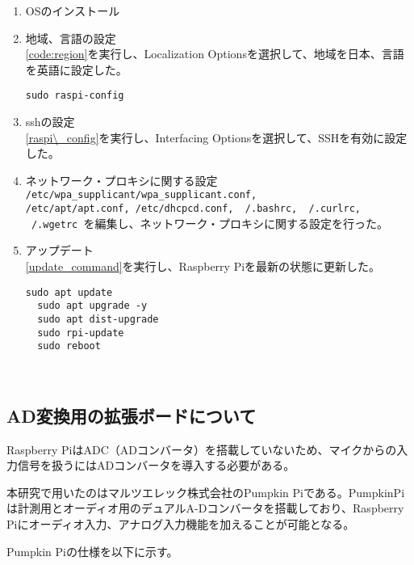 \begin{enumerate}
\renewcommand{\labelenumi}{(\arabic{enumi})}
\item
  OSのインストール
\item
  地域、言語の設定 \\
  \ref{code:region}を実行し、Localization Optionsを選択して、地域を日本、言語を英語に設定した。
  \begin{lstlisting}[caption=Raspberry Piのコンフィグレーションツールの起動コマンド, label=raspi_config]
  sudo raspi-config
  \end{lstlisting}
\item
  sshの設定 \\
  \ref{raspi\_config}を実行し、Interfacing Optionsを選択して、SSHを有効に設定した。
\item
  ネットワーク・プロキシに関する設定 \\
  \texttt{/etc/wpa_supplicant/wpa_supplicant.conf, \\
  /etc/apt/apt.conf, 
  /etc/dhcpcd.conf, 
  ~/.bashrc, 
  ~/.curlrc, 
  ~/.wgetrc
  }を編集し、ネットワーク・プロキシに関する設定を行った。

\item
  アップデート \\
  \ref{update_command}を実行し、Raspberry Piを最新の状態に更新した。

  \begin{lstlisting}[caption=Raspberry Piのアップデートコマンド,label=update_command]
  sudo apt update 
  sudo apt upgrade -y 
  sudo apt dist-upgrade
  sudo rpi-update
  sudo reboot
  \end{lstlisting}
\end{enumerate}

\
\subsection{AD変換用の拡張ボードについて}\label{about-adc}

Raspberry
PiはADC（ADコンバータ）を搭載していないため、マイクからの入力信号を扱うにはADコンバータを導入する必要がある。

本研究で用いたのはマルツエレック株式会社のPumpkin Pi\cite{pumpkin_pi:online}である。PumpkinPiは計測用とオーディオ用のデュアルA-Dコンバータを搭載しており、Raspberry Piにオーディオ入力、アナログ入力機能を加えることが可能となる。

Pumpkin Piの仕様を以下に示す。

